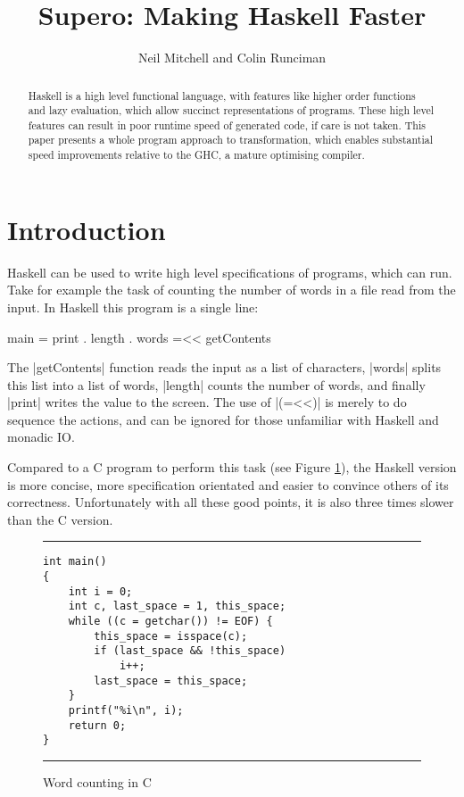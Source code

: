 \documentclass{llncs}
\newenvironment{fig}
    {\begin{figure}[tbp]\hrule}
    {\end{figure}}
\newcommand{\figend}{\hrule}
\begin{document}
\title{Supero: Making Haskell Faster}

\author{Neil Mitchell and Colin Runciman}


\maketitle              %

\begin{abstract}
Haskell is a high level functional language, with features like higher order functions and lazy evaluation, which allow succinct representations of programs. These high level features can result in poor runtime speed of generated code, if care is not taken. This paper presents a whole program approach to transformation, which enables substantial speed improvements relative to the GHC, a mature optimising compiler.
\end{abstract}

\section{Introduction}

Haskell \cite{haskell} can be used to write high level specifications of programs, which can run. Take for example the task of counting the number of words in a file read from the input. In Haskell this program is a single line:

\begin{code}
main = print . length . words =<< getContents
\end{code}

The |getContents| function reads the input as a list of characters, |words| splits this list into a list of words, |length| counts the number of words, and finally |print| writes the value to the screen. The use of |(=<<)| is merely to do sequence the actions, and can be ignored for those unfamiliar with Haskell and monadic IO.

Compared to a C program to perform this task (see Figure \ref{fig:c_words}), the Haskell version is more concise, more specification orientated and easier to convince others of its correctness. Unfortunately with all these good points,  it is also three times slower than the C version.

\begin{fig}
\bigskip
\begin{verbatim}
int main()
{
	int i = 0;
	int c, last_space = 1, this_space;
	while ((c = getchar()) != EOF) {
		this_space = isspace(c);
		if (last_space && !this_space)
			i++;
		last_space = this_space;
	}
	printf("%i\n", i);
	return 0;
}
\end{verbatim}
\figend
\caption{Word counting in C}
\label{fig:c_words}
\end{fig}
\end{document}
